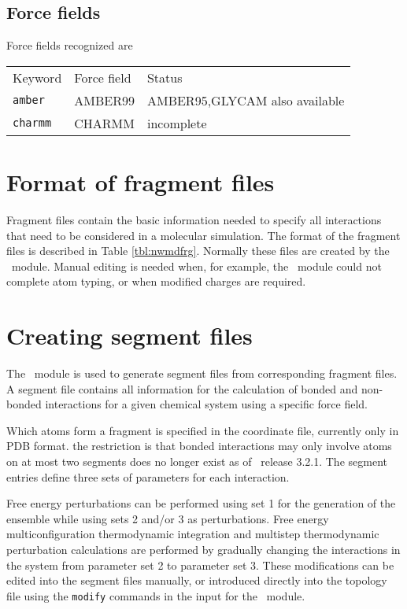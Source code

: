 \subsection{Force fields}
\label{sec:nwaforcefields}
Force fields recognized are
\begin{center}
\begin{tabular}{lll}
\hline
Keyword       & Force field   & Status \\
{\tt amber}   & AMBER99       & AMBER95,GLYCAM also available\\
{\tt charmm}  & CHARMM        & incomplete \\
\hline
\end{tabular}
\end{center}  

\section{Format of fragment files}
Fragment files contain the basic information needed to specify all
interactions that need to be considered in a molecular simulation.
The format of the fragment files is described in Table \ref{tbl:nwmdfrg}.
Normally these files are created by the \prepare\ module. Manual
editing is needed when, for example, the \prepare\ module could not
complete atom typing, or when modified charges are required.

\section{Creating segment files}
\label{sec:nwanwsgm}
The \prepare\ module is used to generate segment files 
from corresponding fragment files. A segment file contains all
information for the calculation of bonded and non-bonded interactions
for a given chemical system using a specific force field.

Which atoms form a fragment is specified in the coordinate file,
currently only in PDB format.
the restriction is that bonded interactions may only involve atoms on at
most two segments does no longer exist as of \nwchem\ release 3.2.1. 
The segment entries define three sets of parameters
for each interaction. 

Free energy perturbations can be performed using set 1 for the 
generation of the ensemble while using sets 2 and/or 3
as perturbations. Free energy multiconfiguration thermodynamic
integration and multistep thermodynamic perturbation calculations are
performed by gradually changing the interactions in the system from
parameter set 2 to parameter set 3. These modifications can be 
edited into the segment files manually, or introduced directly into
the topology file using the \verb+modify+ commands in the input for
the \prepare\ module.

